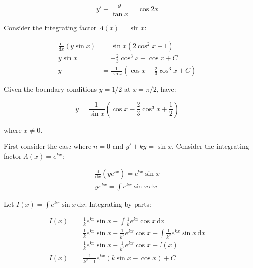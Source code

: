 \documentclass[12pt]{article}
\begin{document}
\begin{equation}
    y' + \frac{y}{\tan{x}} = \cos{2x}
\end{equation}

Consider the integrating factor $\Lambda(x) = \sin{x}$:

\begin{equation}
    \begin{split}
        \frac{\mathrm{d}}{\mathrm{d}x} (y \sin{x}) &= \sin{x} \left( 2\cos^{2}{x} - 1 \right) \\
        y \sin{x} &= -\frac{2}{3} \cos^{3}{x} + \cos{x} + C \\
        y &= \frac{1}{\sin{x}} \left( \cos{x} - \frac{2}{3} \cos^{3}{x} + C \right)
    \end{split}
\end{equation}

Given the boundary conditions $y = 1/2$ at $x = \pi/2$, have:

\begin{equation}
    y = \frac{1}{\sin{x}} \left( \cos{x} - \frac{2}{3} \cos^{3}{x} + \frac{1}{2} \right)
\end{equation}

where $x \ne 0$.


First consider the case where $n = 0$ and $y' + ky = \sin{x}$. Consider the integrating factor $\Lambda(x) = e^{kx}$:

\begin{equation}
    \begin{split}
        \frac{\mathrm{d}}{\mathrm{d}x} \left( y e^{kx} \right) = e^{kx} \sin{x} \\
        y e^{kx} = \int e^{kx} \sin{x} \, \mathrm{d}x
    \end{split}
\end{equation}

Let $I(x) = \int e^{kx} \sin{x} \, \mathrm{d}x$. Integrating by parts:

\begin{equation}
    \begin{split}
        I(x) &= \frac{1}{k} e^{kx} \sin{x} - \int \frac{1}{k} e^{kx} \cos{x} \, \mathrm{d}x \\
        &= \frac{1}{k} e^{kx} \sin{x} - \frac{1}{k^{2}} e^{kx} \cos{x} - \int \frac{1}{k^{2}} e^{kx} \sin{x} \, \mathrm{d}x \\
        &= \frac{1}{k} e^{kx} \sin{x} - \frac{1}{k^{2}} e^{kx} \cos{x} - I(x) \\
        I(x) &= \frac{1}{k^{2} + 1} e^{kx} \left( k \sin{x} - \cos{x} \right) + C
    \end{split}
\end{equation}
\end{document}
